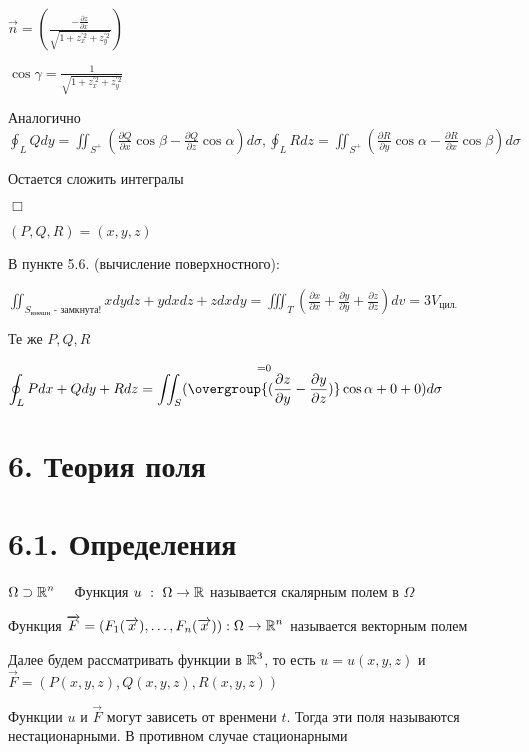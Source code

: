 \documentclass[12pt]{article}
\begin{document}
    $\displaystyle \overrightarrow{n} = (\frac{-\frac{\partial z}{\partial x}}{\sqrt{1 + z_x^{\prime 2} + z_y^{\prime 2}}})$

    $\displaystyle \cos\gamma = \frac{1}{\sqrt{1 + z_x^{\prime 2} + z_y^{\prime 2}}}$

    Аналогично $\displaystyle \oint_L Qdy = \iint_{S^+} (\frac{\partial Q}{\partial x}\cos\beta - \frac{\partial Q}{\partial z}\cos\alpha) d\sigma,
    \oint_L Rdz = \iint_{S^+} (\frac{\partial R}{\partial y}\cos\alpha - \frac{\partial R}{\partial x}\cos\beta) d\sigma$

    Остается сложить интегралы

    $\Box$

     $(P, Q, R) = (x, y, z)$

    В \Exs пункте 5.6. (вычисление поверхностного):

    $\displaystyle \iint_{S_{\text{внешн}} \text{ - замкнута!}} xdydz + ydxdz + zdxdy = \iiint_T (\frac{\partial x}{\partial x} + \frac{\partial y}{\partial y} + \frac{\partial z}{\partial z}) dv = 3V_{\text{цил.}}$

     Те же $P, Q, R$

    $\displaystyle \oint_L Pdx + Qdy + Rdz = \iint_{S} (\overset{= 0}{\overgroup{(\frac{\partial z}{\partial y} - \frac{\partial y}{\partial z})}} \cos\alpha + 0 + 0) d\sigma$

    \clearpage


    \section{6. Теория поля}


    \section{6.1. Определения}

     $\displaystyle \Omega \supset \mathbb{R}^n \quad$ Функция $u \ : \ \Omega \to \mathbb{R}$ называется скалярным полем в $\Omega$

     Функция $\displaystyle \overrightarrow{F} = (F_1(\overrightarrow{x}), \dots, F_n(\overrightarrow{x})) : \Omega \to \mathbb{R}^n$ называется векторным полем

    \Nota Далее будем рассматривать функции в $\displaystyle \mathbb{R}^3$, то есть $u = u(x, y, z)$ и $\overrightarrow{F} = (P(x, y, z), Q(x, y, z), R(x, y, z))$

    \Nota Функции $u$ и $\overrightarrow{F}$ могут зависеть от вренмени $t$. Тогда эти поля называются нестационарными. В противном случае стационарными
\end{document}
